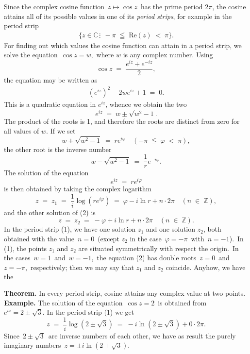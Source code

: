 \documentclass[12pt]{article}
\theoremstyle{definition}
\begin{document}
 

Since the complex cosine function \,$z \mapsto \cos{z}$\, has the prime period $2\pi$, the cosine attains all of its possible values in one of its {\em period strips}, for example in the period strip
\begin{align}
   \{z \in \mathbb{C}\,\vdots\;\, -\pi \;\leqq\; \mbox{Re}(z) \;<\; \pi\}.
\end{align}
For finding out which values the cosine function can attain in a period strip, we solve the equation \,$\cos{z} = w$,\, where $w$ is any complex number.  Using 
     $$\cos{z} \;=\; \frac{e^{iz}+e^{-iz}}{2},$$
the equation may be written as
\begin{align}
(e^{iz})^2-2we^{iz}+1 \;=\; 0.
\end{align}
This is a quadratic equation in $e^{iz}$, whence we obtain the two 
       $$e^{iz} \;=\; w\pm\sqrt{w^2-1}.$$
The product of the roots is 1, and therefore the roots are distinct from zero for all values of $w$.  If we set
    $$w+\sqrt{w^2-1} \;=\; re^{i\varphi} \quad (-\pi \;\leqq\; \varphi \;<\; \pi),$$
the other root is the inverse number
     $$w-\sqrt{w^2-1} \;=\; \frac{1}{r}e^{-i\varphi}.$$
The solution of the equation
       $$e^{iz} \;=\; re^{i\varphi}$$
is then obtained by taking the complex logarithm
    $$z \;=\; z_1 \;=\; \frac{1}{i}\log(re^{i\varphi}) \;=\; \varphi-i\ln{r}+n\cdot2\pi \quad (n\;\in\;\mathbb{Z}),$$
and the other solution of (2) is
     $$z \;=\; z_2 \;=\; -\varphi+i\ln{r}+n\cdot2\pi \quad (n\;\in\;\mathbb{Z}).$$
In the period strip (1), we have one solution $z_1$ and one solution $z_2$, both obtained with the value\, $n = 0$\, (except $z_2$ in the case\, $\varphi = -\pi$\, with\, $n = -1$).\, In (1), the points $z_1$ and $z_2$ are situated symmetrically with respect the origin.\, In the cases\, $w = 1$\, and\, $w = -1$,\, the equation (2) has double roots\, $z = 0$\, and\, $z = -\pi$,\, respectively; then we may say that $z_1$ and $z_2$ coincide.  Anyhow, we have the

\textbf{Theorem.}  In every period strip, cosine attains any complex value at two points.\\

\textbf{Example.}  The solution of the equation\, $\cos{z} = 2$\, is obtained from\, $e^{iz} = 2\!\pm\!\sqrt{3}$.  In the period strip (1) we get
 $$z \;=\; \frac{1}{i}\log(2\!\pm\!\sqrt{3}) \;=\; -i\ln(2\!\pm\!\sqrt{3})+0\cdot2\pi.$$
Since\, $2\!\pm\!\sqrt{3}$\, are inverse numbers of each other, we have as result the purely imaginary numbers 
\,$z = \pm{i}\ln(2\!+\!\sqrt{3})$.\\
\end{document}
